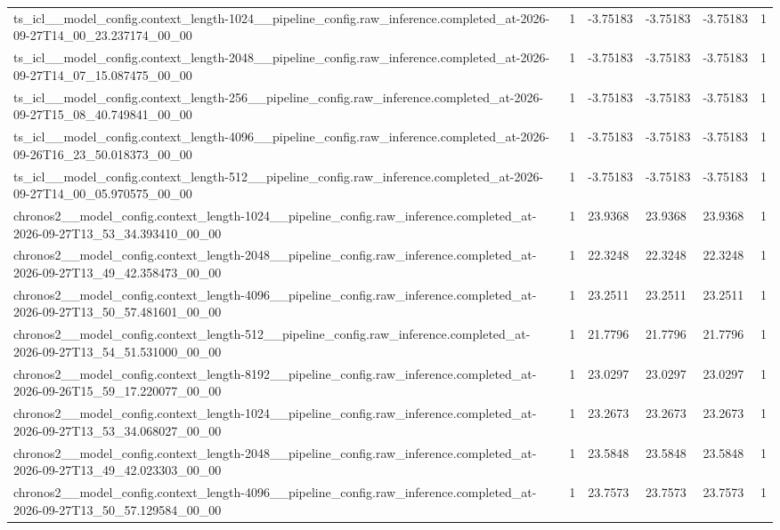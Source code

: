 \begin{tabular}{llllll}
ts\_icl\_\_model\_config.context\_length-1024\_\_pipeline\_config.raw\_inference.completed\_at-2026-09-27T14\_00\_23.237174\_00\_00 & 1 & -3.75183 & -3.75183 & -3.75183 & 1 \\
ts\_icl\_\_model\_config.context\_length-2048\_\_pipeline\_config.raw\_inference.completed\_at-2026-09-27T14\_07\_15.087475\_00\_00 & 1 & -3.75183 & -3.75183 & -3.75183 & 1 \\
ts\_icl\_\_model\_config.context\_length-256\_\_pipeline\_config.raw\_inference.completed\_at-2026-09-27T15\_08\_40.749841\_00\_00 & 1 & -3.75183 & -3.75183 & -3.75183 & 1 \\
ts\_icl\_\_model\_config.context\_length-4096\_\_pipeline\_config.raw\_inference.completed\_at-2026-09-26T16\_23\_50.018373\_00\_00 & 1 & -3.75183 & -3.75183 & -3.75183 & 1 \\
ts\_icl\_\_model\_config.context\_length-512\_\_pipeline\_config.raw\_inference.completed\_at-2026-09-27T14\_00\_05.970575\_00\_00 & 1 & -3.75183 & -3.75183 & -3.75183 & 1 \\
chronos2\_\_model\_config.context\_length-1024\_\_pipeline\_config.raw\_inference.completed\_at-2026-09-27T13\_53\_34.393410\_00\_00 & 1 & 23.9368 & 23.9368 & 23.9368 & 1 \\
chronos2\_\_model\_config.context\_length-2048\_\_pipeline\_config.raw\_inference.completed\_at-2026-09-27T13\_49\_42.358473\_00\_00 & 1 & 22.3248 & 22.3248 & 22.3248 & 1 \\
chronos2\_\_model\_config.context\_length-4096\_\_pipeline\_config.raw\_inference.completed\_at-2026-09-27T13\_50\_57.481601\_00\_00 & 1 & 23.2511 & 23.2511 & 23.2511 & 1 \\
chronos2\_\_model\_config.context\_length-512\_\_pipeline\_config.raw\_inference.completed\_at-2026-09-27T13\_54\_51.531000\_00\_00 & 1 & 21.7796 & 21.7796 & 21.7796 & 1 \\
chronos2\_\_model\_config.context\_length-8192\_\_pipeline\_config.raw\_inference.completed\_at-2026-09-26T15\_59\_17.220077\_00\_00 & 1 & 23.0297 & 23.0297 & 23.0297 & 1 \\
chronos2\_\_model\_config.context\_length-1024\_\_pipeline\_config.raw\_inference.completed\_at-2026-09-27T13\_53\_34.068027\_00\_00 & 1 & 23.2673 & 23.2673 & 23.2673 & 1 \\
chronos2\_\_model\_config.context\_length-2048\_\_pipeline\_config.raw\_inference.completed\_at-2026-09-27T13\_49\_42.023303\_00\_00 & 1 & 23.5848 & 23.5848 & 23.5848 & 1 \\
chronos2\_\_model\_config.context\_length-4096\_\_pipeline\_config.raw\_inference.completed\_at-2026-09-27T13\_50\_57.129584\_00\_00 & 1 & 23.7573 & 23.7573 & 23.7573 & 1 \\

\end{tabular}
